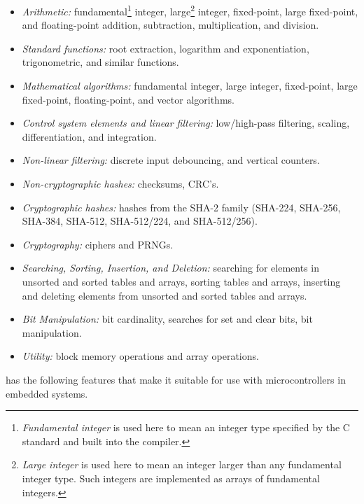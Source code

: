 \begin{itemize}
\item \emph{Arithmetic:}
      fundamental\footnote{\emph{Fundamental integer} is used here
      to mean an integer type
      specified by the C standard and built into the compiler.} integer,
      large\footnote{\emph{Large integer} is used here to mean an integer
      larger than any fundamental integer type.  Such integers are implemented as
      arrays of fundamental integers.} integer, fixed-point, large fixed-point,
      and float\-ing-point addition, subtraction,
      multiplication, and division.
\item \emph{Standard functions:}
      root extraction, logarithm and exponentiation, trigonometric, and similar
      functions.
\item \emph{Mathematical algorithms:}
      fundamental integer, large integer, fixed-point, large fixed-point,
      floating-point, and vector algorithms.
\item \emph{Control system elements and linear filtering:}
      low/high-pass filtering, scaling, differentiation,
      and integration.
\item \emph{Non-linear filtering:}
      discrete input debouncing, and vertical counters.
\item \emph{Non-cryptographic hashes:}
      checksums, CRC's.
\item \emph{Cryptographic hashes:}
      hashes from the SHA-2 family (SHA-224, SHA-256,
      SHA-384, SHA-512, SHA-512/224, and SHA-512/256).
\item \emph{Cryptography:}
      ciphers and PRNGs.
\item \emph{Searching, Sorting, Insertion, and Deletion:}
      searching for elements in unsorted and sorted tables and arrays,
      sorting tables and arrays, inserting and deleting elements from
      unsorted and sorted tables and arrays.
\item \emph{Bit Manipulation:}
      bit cardinality, searches for set and clear bits, bit manipulation.
\item \emph{Utility:}
      block memory
      operations and array operations.
\end{itemize}

\emph{\productbasenameshort{}} has the following features that make it suitable
for use with microcontrollers in embedded systems.

